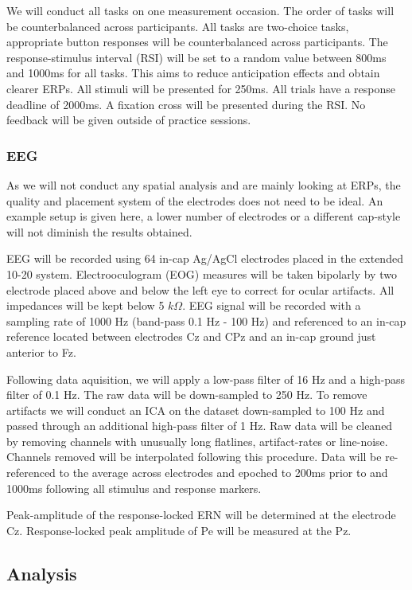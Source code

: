 \documentclass[
  man,floatsintext]{apa7}
\begin{document}
We will conduct all tasks on one measurement occasion. The order of tasks will be counterbalanced across participants. All tasks are two-choice tasks, appropriate button responses will be counterbalanced across participants. The response-stimulus interval (RSI) will be set to a random value between 800ms and 1000ms for all tasks. This aims to reduce anticipation effects and obtain clearer ERPs. All stimuli will be presented for 250ms. All trials have a response deadline of 2000ms. A fixation cross will be presented during the RSI. No feedback will be given outside of practice sessions.

\hypertarget{eeg}{%
\subsubsection{EEG}\label{eeg}}

As we will not conduct any spatial analysis and are mainly looking at ERPs, the quality and placement system of the electrodes does not need to be ideal. An example setup is given here, a lower number of electrodes or a different cap-style will not diminish the results obtained.

EEG will be recorded using 64 in-cap Ag/AgCl electrodes placed in the extended 10-20 system. Electrooculogram (EOG) measures will be taken bipolarly by two electrode placed above and below the left eye to correct for ocular artifacts. All impedances will be kept below 5 \(k\Omega\). EEG signal will be recorded with a sampling rate of 1000 Hz (band-pass 0.1 Hz - 100 Hz) and referenced to an in-cap reference located between electrodes Cz and CPz and an in-cap ground just anterior to Fz.

Following data aquisition, we will apply a low-pass filter of 16 Hz and a high-pass filter of 0.1 Hz. The raw data will be down-sampled to 250 Hz. To remove artifacts we will conduct an ICA on the dataset down-sampled to 100 Hz and passed through an additional high-pass filter of 1 Hz. Raw data will be cleaned by removing channels with unusually long flatlines, artifact-rates or line-noise. Channels removed will be interpolated following this procedure. Data will be re-referenced to the average across electrodes and epoched to 200ms prior to and 1000ms following all stimulus and response markers.

Peak-amplitude of the response-locked ERN will be determined at the electrode Cz. Response-locked peak amplitude of Pe will be measured at the Pz.

\hypertarget{analysis}{%
\subsection{Analysis}\label{analysis}}
\end{document}
